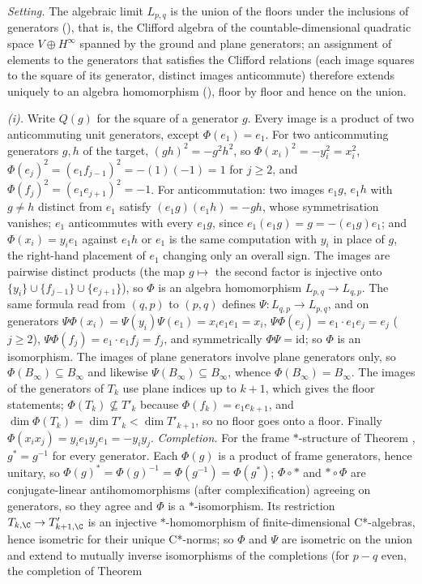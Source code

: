 \emph{Setting.} The algebraic limit $L_{p,q}$ is the union of the floors under the inclusions of generators (), that is, the Clifford algebra of the countable-dimensional quadratic space $V \oplus H^{\infty}$ spanned by the ground and plane generators; an assignment of elements to the generators that satisfies the Clifford relations (each image squares to the square of its generator, distinct images anticommute) therefore extends uniquely to an algebra homomorphism (), floor by floor and hence on the union.

\emph{(i).} Write $Q(g)$ for the square of a generator $g$. Every image is a product of two anticommuting unit generators, except $\Phi(e_{1}) = e_{1}$. For two anticommuting generators $g, h$ of the target, $(gh)^{2} = -g^{2}h^{2}$, so $\Phi(x_{i})^{2} = -y_{i}^{2} = x_{i}^{2}$, $\Phi(e_{j})^{2} = (e_{1}f_{j-1})^{2} = -(1)(-1) = 1$ for $j \ge 2$, and $\Phi(f_{j})^{2} = (e_{1}e_{j+1})^{2} = -1$. For anticommutation: two images $e_{1}g$, $e_{1}h$ with $g \ne h$ distinct from $e_{1}$ satisfy $(e_{1}g)(e_{1}h) = -gh$, whose symmetrisation vanishes; $e_{1}$ anticommutes with every $e_{1}g$, since $e_{1}(e_{1}g) = g = -(e_{1}g)e_{1}$; and $\Phi(x_{i}) = y_{i}e_{1}$ against $e_{1}h$ or $e_{1}$ is the same computation with $y_{i}$ in place of $g$, the right-hand placement of $e_{1}$ changing only an overall sign. The images are pairwise distinct products (the map $g \mapsto$ the second factor is injective onto $\{y_{i}\} \cup \{f_{j-1}\} \cup \{e_{j+1}\}$), so $\Phi$ is an algebra homomorphism $L_{p,q} \to L_{q,p}$. The same formula read from $(q,p)$ to $(p,q)$ defines $\Psi \colon L_{q,p} \to L_{p,q}$, and on generators $\Psi\Phi(x_{i}) = \Psi(y_{i})\Psi(e_{1}) = x_{i}e_{1}e_{1} = x_{i}$, $\Psi\Phi(e_{j}) = e_{1}\cdot e_{1}e_{j} = e_{j}$ ($j \ge 2$), $\Psi\Phi(f_{j}) = e_{1}\cdot e_{1}f_{j} = f_{j}$, and symmetrically $\Phi\Psi = \mathrm{id}$; so $\Phi$ is an isomorphism. The images of plane generators involve plane generators only, so $\Phi(B_{\infty}) \subseteq B_{\infty}$ and likewise $\Psi(B_{\infty}) \subseteq B_{\infty}$, whence $\Phi(B_{\infty}) = B_{\infty}$. The images of the generators of $T_{k}$ use plane indices up to $k+1$, which gives the floor statements; $\Phi(T_{k}) \not\subseteq T'_{k}$ because $\Phi(f_{k}) = e_{1}e_{k+1}$, and $\dim \Phi(T_{k}) = \dim T'_{k} < \dim T'_{k+1}$, so no floor goes onto a floor. Finally $\Phi(x_{i}x_{j}) = y_{i}e_{1}y_{j}e_{1} = -y_{i}y_{j}$. \emph{Completion.} For the frame $*$-structure of Theorem , $g^{*} = g^{-1}$ for every generator. Each $\Phi(g)$ is a product of frame generators, hence unitary, so $\Phi(g)^{*} = \Phi(g)^{-1} = \Phi(g^{-1}) = \Phi(g^{*})$; $\Phi \circ *$ and $* \circ \Phi$ are conjugate-linear antihomomorphisms (after complexification) agreeing on generators, so they agree and $\Phi$ is a $*$-isomorphism. Its restriction $T_{k,\C} \to T'_{k+1,\C}$ is an injective $*$-homomorphism of finite-dimensional C*-algebras, hence isometric for their unique C*-norms; so $\Phi$ and $\Psi$ are isometric on the union and extend to mutually inverse isomorphisms of the completions (for $p - q$ even, the completion of Theorem 